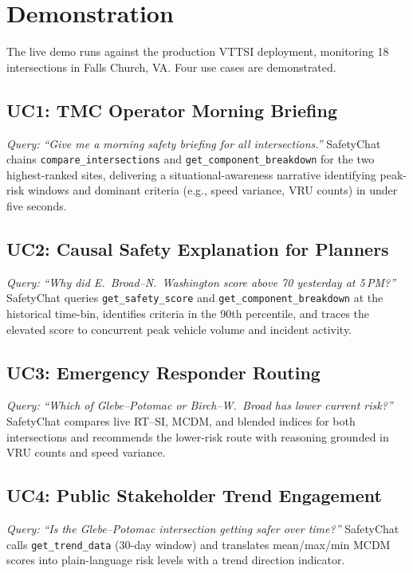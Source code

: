 \documentclass[conference]{IEEEtran}
\begin{document}
\section{Demonstration}
\label{sec:demo}

The live demo runs against the production VTTSI deployment, monitoring 18
intersections in Falls Church, VA. Four use cases are demonstrated.

\subsection{UC1: TMC Operator Morning Briefing}
\textit{Query:} \emph{``Give me a morning safety briefing for all intersections.''}
SafetyChat chains \texttt{compare\_intersections} and \texttt{get\_component\_breakdown}
for the two highest-ranked sites, delivering a situational-awareness narrative
identifying peak-risk windows and dominant criteria (e.g., speed variance, VRU counts)
in under five seconds.

\subsection{UC2: Causal Safety Explanation for Planners}
\textit{Query:} \emph{``Why did E.~Broad--N.~Washington score above 70 yesterday at 5\,PM?''}
SafetyChat queries \texttt{get\_safety\_score} and \texttt{get\_component\_breakdown}
at the historical time-bin, identifies criteria in the 90th percentile, and traces
the elevated score to concurrent peak vehicle volume and incident activity.

\subsection{UC3: Emergency Responder Routing}
\textit{Query:} \emph{``Which of Glebe--Potomac or Birch--W.~Broad has lower current risk?''}
SafetyChat compares live RT--SI, MCDM, and blended indices for both intersections and
recommends the lower-risk route with reasoning grounded in VRU counts and speed variance.

\subsection{UC4: Public Stakeholder Trend Engagement}
\textit{Query:} \emph{``Is the Glebe--Potomac intersection getting safer over time?''}
SafetyChat calls \texttt{get\_trend\_data} (30-day window) and translates mean/max/min
MCDM scores into plain-language risk levels with a trend direction indicator.
\end{document}
